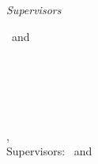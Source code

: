 \begin{titlepage}
	\vfill
	\begin{minipage}[t]{.27\textwidth}
		\raggedleft
	\end{minipage}
	\hspace*{15pt}
	\begin{minipage}[t]{.65\textwidth}
	\end{minipage} \\[5mm]
	\begin{minipage}[t]{.27\textwidth}
		\raggedleft
	\end{minipage}
	\hspace*{15pt}
	\begin{minipage}[t]{.65\textwidth}
	\end{minipage} \\[10mm]
	\begin{minipage}[t]{.27\textwidth}
		\raggedleft
		\textit{Supervisors}
	\end{minipage}
	\hspace*{15pt}
	\begin{minipage}[t]{.65\textwidth}
		\thesisFirstSupervisor\ and \thesisSecondSupervisor
	\end{minipage} \\[10mm]

	\thesisDate \\

\end{titlepage}


\hfill
\vfill
{
	\small
	\textbf{\thesisName} \\
	\textit{\thesisTitle} \\
	\thesisSubject, \thesisDate \\
	Supervisors: \thesisFirstSupervisor\ and \thesisSecondSupervisor \\[1.5em]
	\textbf{\thesisUniversity} \\
	\textit{\thesisUniversityGroup} \\
	\thesisUniversityDepartment \\
	\thesisUniversityStreetAddress \\
	\thesisUniversityPostalCode\ \thesisUniversityCity
}
